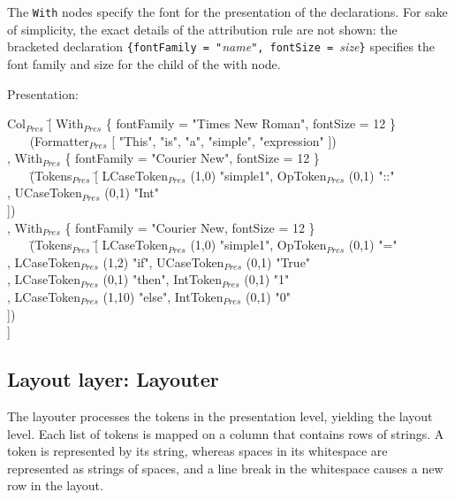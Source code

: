 The \verb|With| nodes specify the font for the presentation of the declarations. For sake of simplicity, the exact details of the attribution rule are not shown: the bracketed declaration \verb|{fontFamily = "|{\em name}\verb|", fontSize = |{\em size}\verb|}| specifies the font family and size for the child of the with node.

Presentation:
\small \ttfamily
\begin{tabbing}
Col$_{Pres}$ \= [ With$_{Pres}$ \{ fontFamily = "Times New Roman", fontSize = 12 \}\\
       \>  ~~~ (Formatter$_{Pres}$ [ "This", "is", "a", "simple", "expression" ])\\
       \>, With$_{Pres}$ \{ fontFamily = "Courier New", fontSize = 12 \}\\
       \>  ~~~ \= (Tokens$_{Pres}$ \= [ LCaseToken$_{Pres}$ (1,0) "simple1",  OpToken$_{Pres}$ (0,1) "::"\\  
       \>          \>              \> , UCaseToken$_{Pres}$ (0,1) "Int"\\
       \>          \>              \> ])\\
       \>, With$_{Pres}$ \{ fontFamily = "Courier New,  fontSize = 12 \}\\
       \>  ~~~ \= (Tokens$_{Pres}$ \= [ LCaseToken$_{Pres}$ (1,0) "simple1", OpToken$_{Pres}$ (0,1) "="\\
       \>          \>              \> , LCaseToken$_{Pres}$ (1,2) "if", UCaseToken$_{Pres}$ (0,1) "True"\\
       \>          \>              \> , LCaseToken$_{Pres}$ (0,1) "then", IntToken$_{Pres}$ (0,1) "1"\\
       \>          \>              \> , LCaseToken$_{Pres}$ (1,10) "else", IntToken$_{Pres}$ (0,1) "0"\\
       \>          \>              \> ])\\
             \> ]
\end{tabbing}
\rmfamily \normalsize



%																
\subsection{Layout layer: Layouter} \label{sect:layouter}

The layouter processes the tokens in the presentation level, yielding the layout level. Each list of tokens is mapped on a column that contains rows of strings. A token is represented by its string, whereas spaces in its whitespace are represented as strings of spaces, and a line break in the whitespace causes a new row in the layout. 

